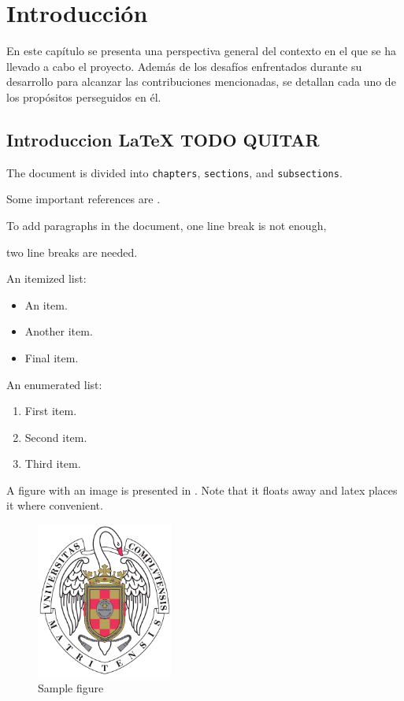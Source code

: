 \chapter{Introducción}

	En este capítulo se presenta una perspectiva general del contexto en el que se ha llevado a cabo el proyecto. Además de los desafíos enfrentados durante su desarrollo para alcanzar las contribuciones mencionadas, se detallan cada uno de los propósitos perseguidos en él.
	

	\section{Introduccion LaTeX TODO QUITAR}
		The document is divided into \texttt{chapters}, \texttt{sections}, and \texttt{subsections}.

		Some important references are \cite{einstein,latexcompanion,knuthwebsite}.

		To add paragraphs in the document, 
		one line break is not enough,

		two line breaks are needed.

		An itemized list:

		\begin{itemize}
			\item An item.
			\item Another item.
			\item Final item.
		\end{itemize}

		An enumerated list:

		\begin{enumerate}
			\item First item.
			\item Second item.
			\item Third item.
		\end{enumerate}

		A figure with an image is presented in . Note that it floats away and latex places it where convenient.

		\begin{figure}[h!] %
			\centering
			\includegraphics[width=0.4\textwidth]{Images/escudo_ucm.pdf}
			\caption{Sample figure} %
			\label{fig:figura}
		\end{figure}
		
